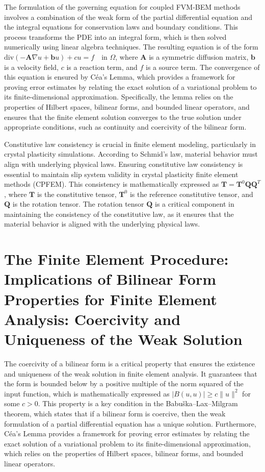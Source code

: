 \documentclass[12pt, a4paper]{article}
\begin{document}
The formulation of the governing equation for coupled FVM-BEM methods involves a combination of the weak form of the partial differential equation and the integral equations for conservation laws and boundary conditions. This process transforms the PDE into an integral form, which is then solved numerically using linear algebra techniques. The resulting equation is of the form \(\text{div}(-\mathbf{A} \nabla u + \mathbf{b} u) + c u = f \quad \text{in } \Omega\), where \(\mathbf{A}\) is a symmetric diffusion matrix, \(\mathbf{b}\) is a velocity field, \(c\) is a reaction term, and \(f\) is a source term. The convergence of this equation is ensured by Céa's Lemma, which provides a framework for proving error estimates by relating the exact solution of a variational problem to its finite-dimensional approximation. Specifically, the lemma relies on the properties of Hilbert spaces, bilinear forms, and bounded linear operators, and ensures that the finite element solution converges to the true solution under appropriate conditions, such as continuity and coercivity of the bilinear form.

Constitutive law consistency is crucial in finite element modeling, particularly in crystal plasticity simulations. According to Schmid's law, material behavior must align with underlying physical laws. Ensuring constitutive law consistency is essential to maintain slip system validity in crystal plasticity finite element methods (CPFEM). This consistency is mathematically expressed as \(\mathbf{T} = \mathbf{T}^0 \mathbf{Q} \mathbf{Q}^T\), where \(\mathbf{T}\) is the constitutive tensor, \(\mathbf{T}^0\) is the reference constitutive tensor, and \(\mathbf{Q}\) is the rotation tensor. The rotation tensor \(\mathbf{Q}\) is a critical component in maintaining the consistency of the constitutive law, as it ensures that the material behavior is aligned with the underlying physical laws.

\section{The Finite Element Procedure: Implications of Bilinear Form Properties for Finite Element Analysis: Coercivity and Uniqueness of the Weak Solution}
\label{sec:04298acb-7e4f-45a2-884d-5a89b3d58f00}

The coercivity of a bilinear form is a critical property that ensures the existence and uniqueness of the weak solution in finite element analysis. It guarantees that the form is bounded below by a positive multiple of the norm squared of the input function, which is mathematically expressed as \(|B(u, u)| \geq c\|u\|^2\) for some \(c > 0\). This property is a key condition in the Babuška–Lax–Milgram theorem, which states that if a bilinear form is coercive, then the weak formulation of a partial differential equation has a unique solution. Furthermore, Céa's Lemma provides a framework for proving error estimates by relating the exact solution of a variational problem to its finite-dimensional approximation, which relies on the properties of Hilbert spaces, bilinear forms, and bounded linear operators.
\end{document}
